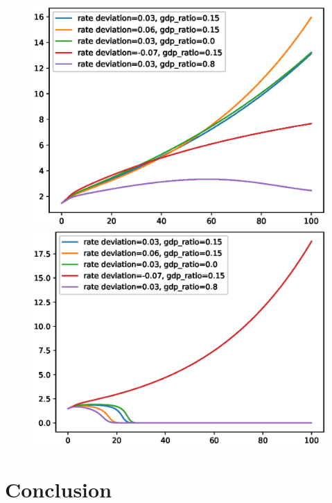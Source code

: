\documentclass[12pt]{article}
\theoremstyle{definition}
\begin{document}
\begin{figure}[htb]
\begin{framed}

\begin{minipage}[t]{.48\textwidth}
\centering
\includegraphics[width=1\textwidth]{economy1_100}
\end{minipage}\hfill
\begin{minipage}[t]{.48\textwidth}
\centering
\includegraphics[width=1\textwidth]{economy2_100}
\end{minipage}\hfill
\end{framed}
\end{figure}

\section{Conclusion}
\end{document}
